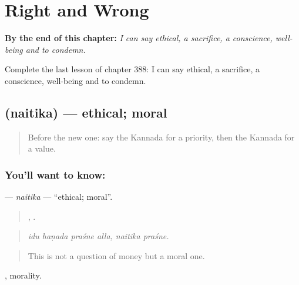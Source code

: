 
\chapter{Right and Wrong}
\label{ch:ka-right-and-wrong}

\begin{chapteropening}
\textbf{By the end of this chapter:} \emph{I can say ethical, a sacrifice, a conscience, well-being and to condemn.}

Complete the last lesson of chapter 388: I can say ethical, a sacrifice, a conscience, well-being and to condemn.
\end{chapteropening}

\section[\texorpdfstring{\kn{ನೈತಿಕ} (naitika)}{ನೈತಿಕ (naitika)}]{ (naitika) — ethical; moral}

\label{lesson:KA-C388-naitika}



\begin{quote}
Before the new one: say the Kannada for a priority, then the Kannada for a value.
\end{quote}

\subsection*{You'll want to know: }
\textbf{} — \emph{naitika} — \textquotedblleft{}ethical; moral\textquotedblright{}.

\begin{quote}
   ,  .
\end{quote}

\begin{quote}
\emph{idu haṇada praśne alla, naitika praśne.}
\end{quote}

\begin{quote}
This is not a question of money but a moral one.
\end{quote}

, morality.

